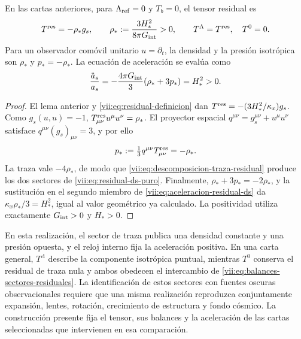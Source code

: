 \begin{theorem}
\label{vii:thm:residual-ds-aceleracion}
En las cartas anteriores, para \(\Lambda_{\rm ref}=0\) y \(T_b=0\),
el tensor residual es
\begin{equation}
 T^{\rm res}=-\rho_*g_s,\qquad
 \rho_*:=\frac{3H_*^2}{8\pi G_{\rm int}}>0,
 \qquad T^\Lambda=T^{\rm res},\quad T^0=0.
 \label{vii:eq:residual-ds-puro}
\end{equation}
Para un observador comóvil unitario \(u=\partial_t\), la densidad
y la presión isotrópica son \(\rho_*\) y \(p_*=-\rho_*\).
La ecuación de aceleración se evalúa como
\begin{equation}
 \frac{\ddot a_s}{a_s}
 =-\frac{4\pi G_{\rm int}}3(\rho_*+3p_*)=H_*^2>0.
 \label{vii:eq:aceleracion-residual-ds}
\end{equation}
\end{theorem}
\begin{proof}
El lema anterior y \eqref{vii:eq:residual-definicion} dan
\(T^{\rm res}=-(3H_*^2/\kappa_x)g_s\).
Como \(g_s(u,u)=-1\),
\(T^{\rm res}_{\mu\nu}u^\mu u^\nu=\rho_*\).
El proyector espacial \(q^{\mu\nu}=g_s^{\mu\nu}+u^\mu u^\nu\)
satisface \(q^{\mu\nu}(g_s)_{\mu\nu}=3\), y por ello
\[
 p_*:=\tfrac13q^{\mu\nu}T^{\rm res}_{\mu\nu}=-\rho_*.
\]
La traza vale \(-4\rho_*\), de modo que
\eqref{vii:eq:descomposicion-traza-residual} produce los dos sectores
de \eqref{vii:eq:residual-ds-puro}. Finalmente,
\(\rho_*+3p_*=-2\rho_*\), y la sustitución en el segundo miembro
de \eqref{vii:eq:aceleracion-residual-ds} da
\(\kappa_x\rho_*/3=H_*^2\), igual al valor geométrico ya calculado.
La positividad utiliza exactamente \(G_{\rm int}>0\) y \(H_*>0\).
\end{proof}

En esta realización, el sector de traza publica una densidad constante
y una presión opuesta, y el reloj interno fija la aceleración positiva.
En una carta general, \(T^\Lambda\) describe la componente isotrópica
puntual, mientras \(T^0\) conserva el residual de traza nula y ambos
obedecen el intercambio de \eqref{vii:eq:balances-sectores-residuales}.
La identificación de estos sectores con fuentes oscuras observacionales
requiere que una misma realización reproduzca conjuntamente expansión,
lentes, rotación, crecimiento de estructura y fondo cósmico. La
construcción presente fija el tensor, sus balances y la aceleración de
las cartas seleccionadas que intervienen en esa comparación.
